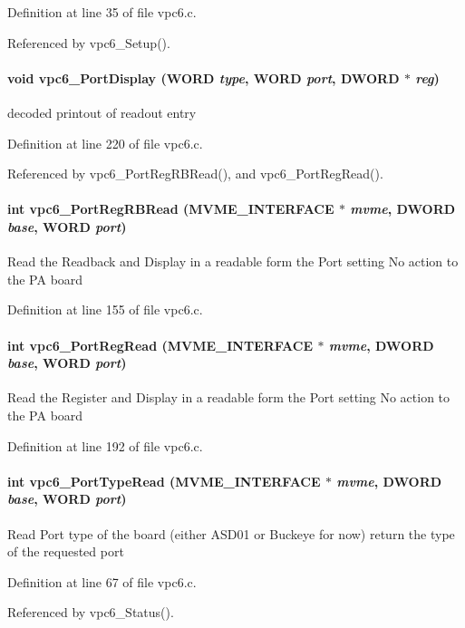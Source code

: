 Definition at line 35 of file vpc6.c.

Referenced by vpc6\_\-Setup().
\paragraph[{vpc6\_\-PortDisplay}]{\setlength{\rightskip}{0pt plus 5cm}void vpc6\_\-PortDisplay ({\bf WORD} {\em type}, \/  {\bf WORD} {\em port}, \/  {\bf DWORD} $\ast$ {\em reg})}\hfill\label{vpc6_8h_a30c15080312a5dbb3bfb9bc4e1b21202}
decoded printout of readout entry 

Definition at line 220 of file vpc6.c.

Referenced by vpc6\_\-PortRegRBRead(), and vpc6\_\-PortRegRead().
\paragraph[{vpc6\_\-PortRegRBRead}]{\setlength{\rightskip}{0pt plus 5cm}int vpc6\_\-PortRegRBRead ({\bf MVME\_\-INTERFACE} $\ast$ {\em mvme}, \/  {\bf DWORD} {\em base}, \/  {\bf WORD} {\em port})}\hfill\label{vpc6_8h_a0d9b6b536c70f925f3abe043310b3f64}
Read the Readback and Display in a readable form the Port setting No action to the PA board 

Definition at line 155 of file vpc6.c.
\paragraph[{vpc6\_\-PortRegRead}]{\setlength{\rightskip}{0pt plus 5cm}int vpc6\_\-PortRegRead ({\bf MVME\_\-INTERFACE} $\ast$ {\em mvme}, \/  {\bf DWORD} {\em base}, \/  {\bf WORD} {\em port})}\hfill\label{vpc6_8h_a03b97f9c9cb620dfa76f19cefacb4f4e}
Read the Register and Display in a readable form the Port setting No action to the PA board 

Definition at line 192 of file vpc6.c.
\paragraph[{vpc6\_\-PortTypeRead}]{\setlength{\rightskip}{0pt plus 5cm}int vpc6\_\-PortTypeRead ({\bf MVME\_\-INTERFACE} $\ast$ {\em mvme}, \/  {\bf DWORD} {\em base}, \/  {\bf WORD} {\em port})}\hfill\label{vpc6_8h_ac870864055cc5eea66f7229a2bd44073}
Read Port type of the board (either ASD01 or Buckeye for now) return the type of the requested port 

Definition at line 67 of file vpc6.c.

Referenced by vpc6\_\-Status().
